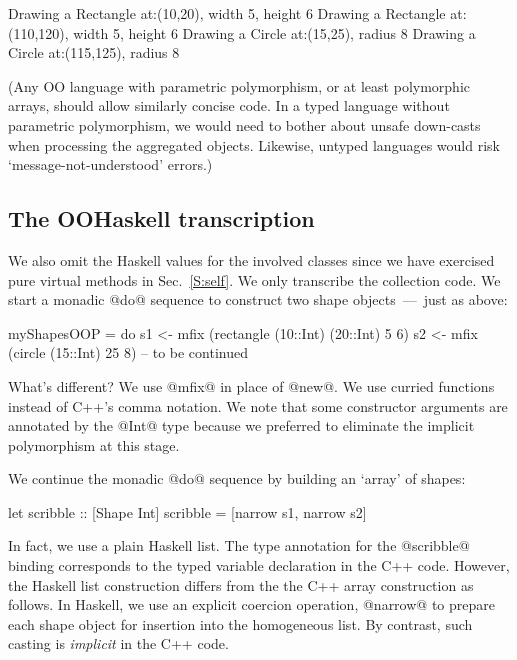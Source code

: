\begin{code}
 Drawing a Rectangle at:(10,20), width 5, height 6
 Drawing a Rectangle at:(110,120), width 5, height 6
 Drawing a Circle at:(15,25), radius 8
 Drawing a Circle at:(115,125), radius 8
\end{code}

\noindent
(Any OO language with parametric polymorphism, or at least polymorphic
arrays, should allow similarly concise code. In a typed language
without parametric polymorphism, we would need to bother about unsafe
down-casts when processing the aggregated objects. Likewise, untyped
languages would risk `message-not-understood' errors.)






\subsection{The OOHaskell transcription}

We also omit the Haskell values for the involved classes since we have
exercised pure virtual methods in Sec.~\ref{S:self}. We only
transcribe the collection code. We start a monadic @do@ sequence to
construct two shape objects~---~just as above:

\begin{code}
 myShapesOOP =
    do
       s1 <- mfix (rectangle (10::Int) (20::Int) 5 6)
       s2 <- mfix (circle (15::Int) 25 8)
       -- to be continued
\end{code}

\noindent
What's different? We use @mfix@ in place of @new@. We use curried
functions instead of C++'s comma notation.  We note that some
constructor arguments are annotated by the @Int@ type because we
preferred to eliminate the implicit polymorphism at this stage.

We continue the monadic @do@ sequence by building an `array' of
shapes:

\begin{code}
       let scribble :: [Shape Int]
           scribble = [narrow s1, narrow s2]
\end{code}

\noindent
In fact, we use a plain Haskell list. The type annotation for the
@scribble@ binding corresponds to the typed variable declaration in
the C++ code. However, the Haskell list construction differs from the
the C++ array construction as follows. In Haskell, we use an
explicit coercion operation, @narrow@ to prepare each shape object for
insertion into the homogeneous list. By contrast, such casting is
\emph{implicit} in the C++ code.

